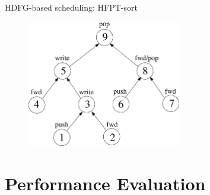 \documentclass{beamer}
\begin{document}
\begin{CJK}{UTF8}{bkai}
    \begin{frame}{HDFG-based scheduling: HFPT-sort}
        \begin{figure}[!h]
            \begin{center}
                \includegraphics[width=0.6\textwidth]{figs/hfpt.eps}
            \end{center}
            \label{fig:hfpt}
        \end{figure}%
    \end{frame}
        
    \section{Performance Evaluation}

\end{CJK}
\end{document}
